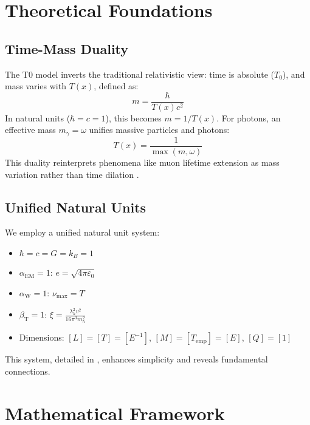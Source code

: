 \documentclass[12pt,a4paper]{article}
\newcommand{\Tfield}{T(x)}
\begin{document}
	\section{Theoretical Foundations}
	
	\subsection{Time-Mass Duality}
	
	The T0 model inverts the traditional relativistic view: time is absolute (\(T_0\)), and mass varies with \(\Tfield\), defined as:
	\begin{equation}
		m = \frac{\hbar}{\Tfield c^2}
	\end{equation}
	In natural units (\(\hbar = c = 1\)), this becomes \(m = 1/\Tfield\). For photons, an effective mass \(m_\gamma = \omega\) unifies massive particles and photons:
	\begin{equation}
		\Tfield = \frac{1}{\max(m, \omega)}
	\end{equation}
	This duality reinterprets phenomena like muon lifetime extension as mass variation rather than time dilation \cite{pascher_perspektive_2025, pascher_zeit_2025}.
	
	\subsection{Unified Natural Units}
	
	We employ a unified natural unit system:
	\begin{tcolorbox}[colback=blue!5!white,colframe=blue!75!black,title=Unified Natural Units]
		\begin{itemize}
			\item \(\hbar = c = G = k_B = 1\)
			\item \(\alpha_{\text{EM}} = 1\): \(e = \sqrt{4\pi\varepsilon_0}\)
			\item \(\alpha_{\text{W}} = 1\): \(\nu_{\text{max}} = T\)
			\item \(\beta_{\text{T}} = 1\): \(\xi = \frac{\lambda_h^2 v^2}{16\pi^3 m_h^2}\)
			\item Dimensions: \([L] = [T] = [E^{-1}]\), \([M] = [T_{\text{emp}}] = [E]\), \([Q] = [1]\)
		\end{itemize}
	\end{tcolorbox}
	This system, detailed in \cite{pascher_alphabeta_2025, pascher_alpha_2025, pascher_temp_2025}, enhances simplicity and reveals fundamental connections.
	
	\section{Mathematical Framework}
	
\end{document}
